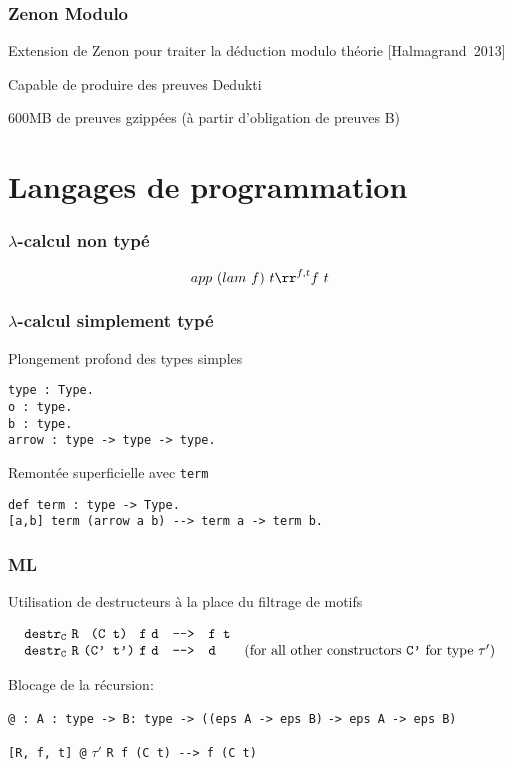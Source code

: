 \documentclass[12pt,aspectratio=169]{beamer}
\newcommand\lst[1]{{\lstinline{#1}}}
\begin{document}
\begin{frame}
  \frametitle{Zenon Modulo}
  Extension de Zenon pour traiter la déduction modulo théorie
  [Halmagrand~2013]
  \bigskip
  
  Capable de produire des preuves Dedukti
  \medskip
  
  600MB de preuves gzippées (à partir d'obligation de preuves B)
\end{frame}

\section{Langages de programmation}
\begin{frame}
  \frametitle{$\lambda$-calcul non typé}

  $$app~(lam~f)~t \rr^{f,t} f~t$$
\end{frame}

\begin{frame}[fragile]
  \frametitle{$\lambda$-calcul simplement typé}
  Plongement profond des types simples
\begin{lstlisting}
type : Type.
o : type.
b : type.
arrow : type -> type -> type.
\end{lstlisting}
  
Remontée superficielle avec \lst{term}

\begin{lstlisting}
def term : type -> Type.
[a,b] term (arrow a b) --> term a -> term b.
\end{lstlisting}
\end{frame}

\begin{frame}[fragile]
  \frametitle{ML}
  Utilisation de destructeurs à la place du filtrage de motifs

$$\begin{array}{c@{~}c@{~}c@{~}c@{~}ccll}
  \texttt{{destr}}_{\texttt{{C}}} & \texttt{{R}} & \texttt{{(C t)}}  & \texttt{{f}} & \texttt{{d}} & \texttt{{-{}->}} & \texttt{{f t}} & \\
  \texttt{{destr}}_{\texttt{{C}}} & \texttt{{R}} & \texttt{{(C' t')}}& \texttt{{f}} & \texttt{{d}} & \texttt{{-{}->}} & \texttt{{d}} &
  \text{(for all other constructors \texttt{C'} for type $\tau'$)} %
  \end{array}$$

  Blocage de la récursion:

    \lst{@ : A : type -> B: type -> ((eps A -> eps B)} \lst{-> eps A -> eps B)}

    \lst{[R, f, t] @} $\tau'$ \lst{R f (C t) --> f (C t)}

  
\end{frame}
\end{document}
